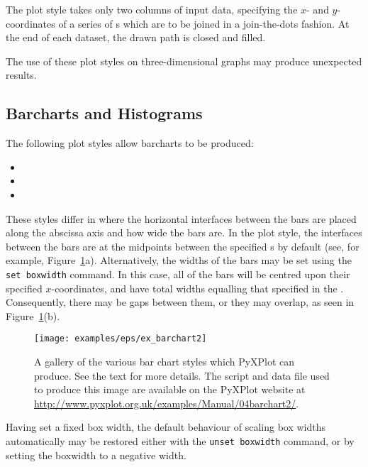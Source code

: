 The  plot style takes only two columns of input data,
specifying the $x$- and $y$-coordinates of a series of \datapoint s which are
to be joined in a join-the-dots fashion. At the end of each dataset, the drawn
path is closed and filled.

The use of these plot styles on three-dimensional graphs may produce unexpected
results.

\subsection{Barcharts and Histograms}
\label{sec:barcharts}

The following plot styles allow barcharts to be produced:
\begin{itemize}
\item {}
\item {}
\item {}
\end{itemize}
These styles differ in where the horizontal interfaces between the
bars are placed along the abscissa axis and how wide the bars are.  In the
 plot style, the interfaces between the bars are at the midpoints
between the specified \datapoint s by default (see, for example,
Figure~\ref{fig:ex_barchart2}a).  Alternatively, the widths of the bars may be
set using the {\tt set boxwidth} command. In this case, all of the bars will be
centred upon their specified $x$-coordinates, and have total widths equalling
that specified in the . Consequently, there may be gaps
between them, or they may overlap, as seen in Figure~\ref{fig:ex_barchart2}(b).

\begin{figure}
\begin{center}
\texttt{[image: examples/eps/ex\_barchart2]}
\end{center}
\caption[A gallery of the various bar chart styles which PyXPlot can produce]
{A gallery of the various bar chart styles which PyXPlot can produce.
See the text for more details.  The script and data file used to produce this
image are available on the PyXPlot website at
\protect\url{http://www.pyxplot.org.uk/examples/Manual/04barchart2/}.}
\label{fig:ex_barchart2}
\end{figure}

Having set a fixed box width, the default behaviour of scaling box widths
automatically may be restored either with the {\tt unset boxwidth} command,
or by setting the boxwidth to a negative width.

